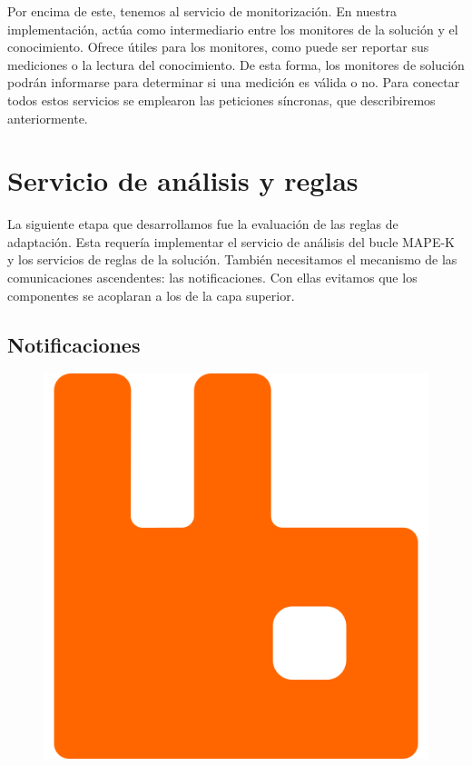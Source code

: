 Por encima de este, tenemos al servicio de monitorización. En nuestra implementación, actúa como intermediario entre los monitores de la solución y el conocimiento. Ofrece  útiles para los monitores, como puede ser reportar sus mediciones o la lectura del conocimiento. De esta forma, los monitores de solución podrán informarse para determinar si una medición es válida o no. Para conectar todos estos servicios se emplearon las peticiones síncronas, que describiremos anteriormente.

\section{Servicio de análisis y reglas}
\label{sec:implementacion-modulo-reglas}

La siguiente etapa que desarrollamos fue la evaluación de las reglas de adaptación. Esta requería implementar el servicio de análisis del bucle MAPE-K y los servicios de reglas de la solución. También necesitamos el mecanismo de las comunicaciones ascendentes: las notificaciones. Con ellas evitamos que los componentes se acoplaran a los de la capa superior.

\subsection{Notificaciones}

\begin{figure}
  \vspace{-20pt}
  \includegraphics[scale=0.09]{cap_implementacion/images/rabbitmq}
  \centering
\end{figure}

